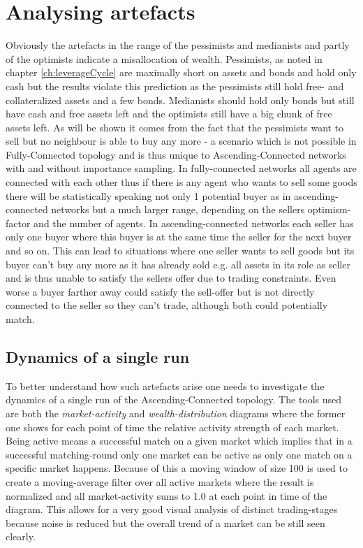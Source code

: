 \documentclass[Bachelorarbeit.tex]{subfiles}
\begin{document}
\section{Analysing artefacts}
Obviously the artefacts in the range of the pessimists and medianists and partly of the optimists indicate a misallocation of wealth. Pessimists, as noted in chapter \ref{ch:leverageCycle} are maximally short on assets and bonds and hold only cash but the results violate this prediction as the pessimists still hold free- and collateralized assets and a few bonds. Medianists should hold only bonds but still have cash and free assets left and the optimists still have a big chunk of free assets left. As will be shown it comes from the fact that the pessimists want to sell but no neighbour is able to buy any more - a scenario which is not possible in Fully-Connected topology and is thus unique to Ascending-Connected networks with and without importance sampling. In fully-connected networks all agents are connected with each other thus if there is any agent who wants to sell some goods there will be statistically speaking not only 1 potential buyer as in ascending-connected networks but a much larger range, depending on the sellers optimism-factor and the number of agents. In ascending-connected networks each seller has only one buyer where this buyer is at the same time the seller for the next buyer and so on. This can lead to situations where one seller wants to sell goods but its buyer can't buy any more as it has already sold e.g. all assets in its role as seller and is thus unable to satisfy the sellers offer due to trading constraints. Even worse a buyer farther away could satisfy the sell-offer but is not directly connected to the seller so they can't trade, although both could potentially match.

\subsection{Dynamics of a single run}
\label{sub:dynamics_singlerun}
To better understand how such artefacts arise one needs to investigate the dynamics of a single run of the Ascending-Connected topology. The tools used are both the \textit{market-activity} and \textit{wealth-distribution} diagrams where the former one shows for each point of time the relative activity strength of each market. Being active means a successful match on a given market which implies that in a successful matching-round only one market can be active as only one match on a specific market happens. Because of this a moving window of size 100 is used to create a moving-average filter over all active markets where the result is normalized and all market-activity sums to 1.0 at each point in time of the diagram. This allows for a very good visual analysis of distinct trading-stages because noise is reduced but the overall trend of a market can be still seen clearly.
\end{document}

